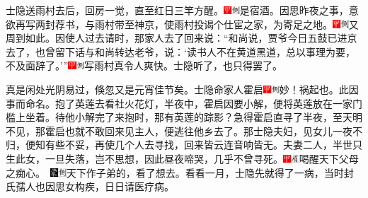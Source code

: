 士隐送雨村去后，回房一觉，直至红日三竿方醒。{\includegraphics[width=3mm]{../Images/00002}\includegraphics[width=3mm]{../Images/00011}\footnotesize \kaishu 是宿酒。}因思昨夜之事，意欲再写两封荐书，与雨村带至神京，使雨村投谒个仕宦之家，为寄足之地。{\includegraphics[width=3mm]{../Images/00002}\includegraphics[width=3mm]{../Images/00011}\footnotesize \kaishu 又周到如此。}因使人过去请时，那家人去了回来说：``和尚说，贾爷今日五鼓已进京去了，也曾留下话与和尚转达老爷，说：`读书人不在黄道黑道，总以事理为要，不及面辞了。'''{\includegraphics[width=3mm]{../Images/00002}\includegraphics[width=3mm]{../Images/00011}\footnotesize \kaishu 写雨村真令人爽快。}士隐听了，也只得罢了。

真是闲处光阴易过，倏忽又是元宵佳节矣。士隐命家人霍启{\includegraphics[width=3mm]{../Images/00002}\includegraphics[width=3mm]{../Images/00011}\footnotesize \kaishu 妙！祸起也。此因事而命名。}抱了英莲去看社火花灯，半夜中，霍启因要小解，便将英莲放在一家门槛上坐着。待他小解完了来抱时，那有英莲的踪影？急得霍启直寻了半夜，至天明不见，那霍启也就不敢回来见主人，便逃往他乡去了。那士隐夫妇，见女儿一夜不归，便知有些不妥，再使几个人去寻找，回来皆云连音响皆无。夫妻二人，半世只生此女，一旦失落，岂不思想，因此昼夜啼哭，几乎不曾寻死。{{\includegraphics[width=3mm]{../Images/00002}\includegraphics[width=3mm]{../Images/00010}\footnotesize \kaishu 喝醒天下父母之痴心。　}\includegraphics[width=3mm]{../Images/00006}\includegraphics[width=3mm]{../Images/00011}\footnotesize \kaishu 天下作子弟的，看了想去。}看看一月，士隐先就得了一病，当时封氏孺人也因思女构疾，日日请医疗病。

